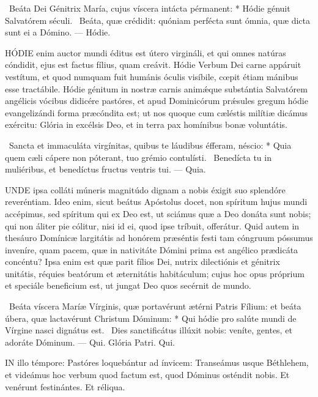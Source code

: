 \R\ Beáta Dei Génitrix María, cujus víscera intácta pérmanent: * Hódie génuit Salvatórem séculi. \V\ Beáta, quæ crédidit: quóniam perfécta sunt ómnia, quæ dicta sunt ei a Dómino. --- Hódie.


\lettrine[lines=2]{H}{ÓDIE} enim auctor mundi éditus est útero virgináli, et qui omnes natúras cóndidit, ejus est factus fílius, quam creávit. Hódie Verbum Dei carne appáruit vestítum, et quod numquam fuit humánis óculis visíbile, cœpit étiam mánibus esse tractábile. Hódie génitum in nostræ carnis animǽque substántia Salvatórem angélicis vócibus didicére pastóres, et apud Dominicórum prǽsules gregum hódie evangelizándi forma præcóndita est; ut nos quoque cum cæléstis milítiæ dicámus exércitu: Glória in excélsis Deo, et in terra pax homínibus bonæ voluntátis.

\R\ Sancta et immaculáta virgínitas, quibus te láudibus éfferam, néscio: * Quia quem cæli cápere non póterant, tuo grémio contulísti. \V\ Benedícta tu in muliéribus, et benedíctus fructus ventris tui. --- Quia.


\lettrine[lines=2]{U}{NDE} ipsa colláti múneris magnitúdo dignam a nobis éxigit suo splendóre reveréntiam. Ideo enim, sicut beátus Apóstolus docet, non spíritum hujus mundi accépimus, sed spíritum qui ex Deo est, ut sciámus quæ a Deo donáta sunt nobis; qui non áliter pie cólitur, nisi id ei, quod ipse tríbuit, offerátur. Quid autem in thesáuro Domínicæ largitátis ad honórem præséntis festi tam cóngruum póssumus inveníre, quam pacem, quæ in nativitáte Dómini prima est angélico prædicáta concéntu? Ipsa enim est quæ parit fílios Dei, nutrix dilectiónis et génitrix unitátis, réquies beatórum et æternitátis habitáculum; cujus hoc opus próprium et speciále beneficium est, ut jungat Deo quos secérnit de mundo.

\R\ Beáta víscera Maríæ Vírginis, quæ portavérunt ætérni Patris Fílium: et beáta úbera, quæ lactavérunt Christum Dóminum: * Qui hódie pro salúte mundi de Vírgine nasci dignátus est. \V\ Dies sanctificátus illúxit nobis: veníte, gentes, et adoráte Dóminum. --- Qui. Glória Patri. Qui.




\lettrine[lines=2]{I}{N} illo témpore: Pastóres loquebántur ad ínvicem: Transeámus usque Béthlehem, et videámus hoc verbum quod factum est, quod Dóminus osténdit nobis. Et venérunt festinántes. Et réliqua.


